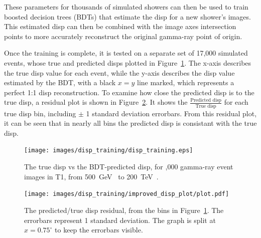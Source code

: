 These parameters for thousands of simulated showers can then be used to train boosted decision trees (BDTs) that estimate the disp for a new shower's images.
This estimated disp can then be combined with the image axes intersection points to more accurately reconstruct the original gamma-ray point of origin.

Once the training is complete, it is tested on a separate set of 17,000 simulated events, whose true and predicted disps plotted in Figure~\ref{fig:disptraining}.
The x-axis describes the true disp value for each event, while the y-axis describes the disp value estimated by the BDT, with a black $x=y$ line marked, which represents a perfect 1:1 disp reconstruction.
To examine how close the predicted disp is to the true disp, a residual plot is shown in Figure~\ref{fig:dispresidual}.
It shows the $\frac{\textrm{Predicted disp}}{\textrm{True disp}}$ for each true disp bin, including $\pm$ 1 standard deviation errorbars.
From this residual plot, it can be seen that in nearly all bins the predicted disp is consistant with the true disp.

\begin{figure}[b]
  \centering
  \texttt{[image: images/disp\_training/disp\_training.eps]}
  \caption[Disp BDT Training]{
    The true disp vs the BDT-predicted disp, for ,000 gamma-ray event images in T1, from \SI{500}{\GeV{}} to \SI{200}{\TeV{}}.
  }
  \label{fig:disptraining}
\end{figure}

\begin{figure}[t]
  \centering
  \texttt{[image: images/disp\_training/improved\_disp\_plot/plot.pdf]}
  \caption[Disp BDT Residual]{
    The predicted/true disp residual, from the bins in Figure~\ref{fig:disptraining}.
    The errorbars represent 1 standard deviation.
    The graph is split at $x=0.75^{\circ}$ to keep the errorbars visible.
  }
  \label{fig:dispresidual}
\end{figure}

